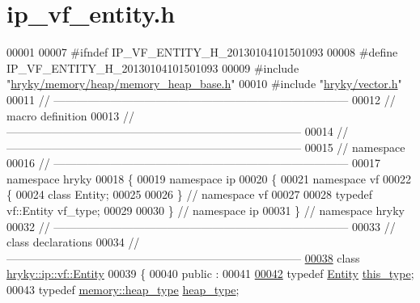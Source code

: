 \hypertarget{ip__vf__entity_8h_source}{\section{ip\-\_\-vf\-\_\-entity.\-h}
}

\begin{DoxyCode}
00001 
00007 \textcolor{preprocessor}{#ifndef IP\_VF\_ENTITY\_H\_20130104101501093}
00008 \textcolor{preprocessor}{}\textcolor{preprocessor}{#define IP\_VF\_ENTITY\_H\_20130104101501093}
00009 \textcolor{preprocessor}{}\textcolor{preprocessor}{#include "\hyperlink{memory__heap__base_8h}{hryky/memory/heap/memory_heap_base.h}"}
00010 \textcolor{preprocessor}{#include "\hyperlink{vector_8h}{hryky/vector.h}"}
00011 \textcolor{comment}{//
      ------------------------------------------------------------------------------}
00012 \textcolor{comment}{// macro definition}
00013 \textcolor{comment}{//
      ------------------------------------------------------------------------------}
00014 \textcolor{comment}{//
      ------------------------------------------------------------------------------}
00015 \textcolor{comment}{// namespace}
00016 \textcolor{comment}{//
      ------------------------------------------------------------------------------}
00017 \textcolor{keyword}{namespace }hryky
00018 \{
00019 \textcolor{keyword}{namespace }ip
00020 \{
00021 \textcolor{keyword}{namespace }vf
00022 \{
00024     \textcolor{keyword}{class }Entity;
00025 
00026 \} \textcolor{comment}{// namespace vf}
00027 
00028 \textcolor{keyword}{typedef} vf::Entity vf\_type;
00029 
00030 \} \textcolor{comment}{// namespace ip}
00031 \} \textcolor{comment}{// namespace hryky}
00032 \textcolor{comment}{//
      ------------------------------------------------------------------------------}
00033 \textcolor{comment}{// class declarations}
00034 \textcolor{comment}{//
      ------------------------------------------------------------------------------}
\hypertarget{ip__vf__entity_8h_source_l00038}{}\hyperlink{classhryky_1_1ip_1_1vf_1_1_entity}{00038} \textcolor{comment}{}\textcolor{keyword}{class }\hyperlink{classhryky_1_1ip_1_1vf_1_1_entity}{hryky::ip::vf::Entity}
00039 \{
00040 \textcolor{keyword}{public} :
00041 
\hypertarget{ip__vf__entity_8h_source_l00042}{}\hyperlink{classhryky_1_1ip_1_1vf_1_1_entity_adf2e2de606d79343c1f1a1aa016d9abd}{00042}     \textcolor{keyword}{typedef} \hyperlink{classhryky_1_1ip_1_1vf_1_1_entity}{Entity} \hyperlink{classhryky_1_1ip_1_1vf_1_1_entity_adf2e2de606d79343c1f1a1aa016d9abd}{this_type};
00043     \textcolor{keyword}{typedef} \hyperlink{classhryky_1_1memory_1_1heap_1_1_base}{memory::heap_type} \hyperlink{classhryky_1_1memory_1_1heap_1_1_base}{heap_type};

\end{DoxyCode}
